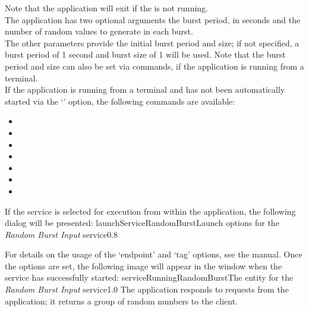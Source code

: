 Note that the application will exit if the  is not
running.\\

The application has two optional arguments \longDash{} the burst period, in seconds and
the number of random values to generate in each burst.
\insertAppParameters
{}
\insertInputServiceComment\\

The other parameters provide the initial burst period and size; if not specified, a burst
period of 1 second and burst size of 1 will be used.
Note that the burst period and size can also be set via commands, if the application is
running from a terminal.\\

If the application is running from a terminal and has not been automatically started via
the `' option, the following commands are available:
\begin{itemize}
\item{}
\item\exSp{}
\item\exSp{}
\item\exSp{}
\item\exSp{}
\item\exSp{}
\item\exSp{}
\end{itemize}
\condPage
If the service is selected for execution from within the \emph{\CMU} application, the
following dialog will be presented:
%
{launchServiceRandomBurst}{Launch options for the \emph{Random Burst Input} service}{0.8}

For details on the usage of the `endpoint' and `tag' options, see the \emph{\CMU} manual.
Once the options are set, the following image will appear in the \emph{\CMU} window when
the service has successfully started:
%
{serviceRunningRandomBurst}{The \emph{\CMU} entity for the \emph{Random Burst Input}
service}{1.0}
\condPage
{}
The  application responds to
 requests from the
 application; it returns a group of random
numbers to the client.\\


